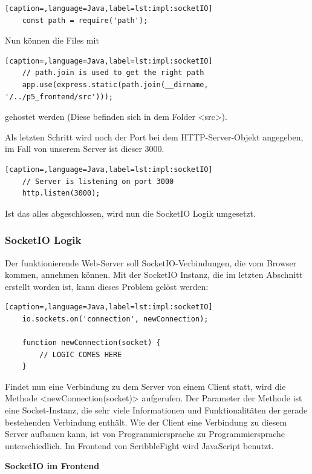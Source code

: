 \begin{lstlisting}[caption=,language=Java,label=lst:impl:socketIO]
    const path = require('path');
\end{lstlisting}

Nun können die Files mit \\

\begin{lstlisting}[caption=,language=Java,label=lst:impl:socketIO]
    // path.join is used to get the right path 
    app.use(express.static(path.join(__dirname, '/../p5_frontend/src')));
\end{lstlisting}

gehostet werden (Diese befinden sich in dem Folder <src>).

Als letzten Schritt wird noch der Port bei dem HTTP-Server-Objekt angegeben, im Fall von unserem Server ist dieser 3000.
\begin{lstlisting}[caption=,language=Java,label=lst:impl:socketIO]
    // Server is listening on port 3000
    http.listen(3000);
\end{lstlisting}

Ist das alles abgeschlossen, wird nun die SocketIO Logik umgesetzt.

\subsubsection{SocketIO Logik}
Der funktionierende Web-Server soll SocketIO-Verbindungen, die vom Browser kommen, annehmen können.
Mit der SocketIO Instanz, die im letzten Abschnitt erstellt worden ist, kann dieses Problem gelöst werden:

\begin{lstlisting}[caption=,language=Java,label=lst:impl:socketIO]
    io.sockets.on('connection', newConnection);

    function newConnection(socket) {
        // LOGIC COMES HERE
    }
\end{lstlisting}

Findet nun eine Verbindung zu dem Server von einem Client statt, wird die Methode <newConnection(socket)> aufgerufen.
Der Parameter der Methode ist eine Socket-Instanz, die sehr viele Informationen und Funktionalitäten der gerade bestehenden Verbindung enthält.
Wie der Client eine Verbindung zu diesem Server aufbauen kann, ist von Programmiersprache zu Programmiersprache unterschiedlich. Im Frontend von ScribbleFight wird JavaScript benutzt.

\textbf{SocketIO im Frontend}

